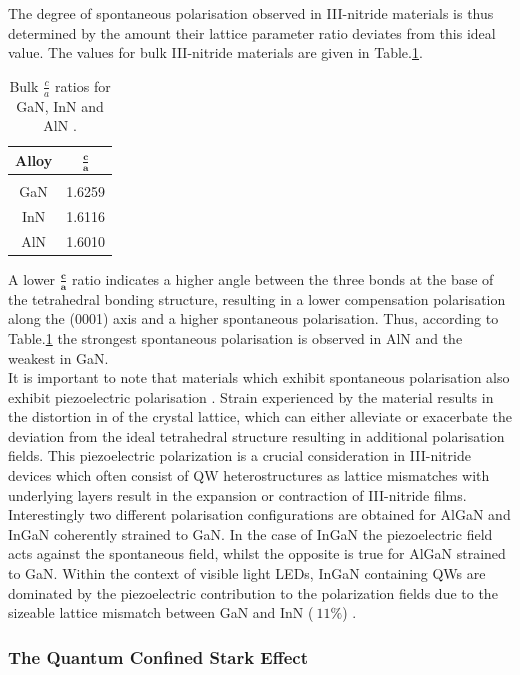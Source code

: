 The degree of spontaneous polarisation observed in III-nitride materials is thus determined by the amount their lattice parameter ratio deviates from this ideal value. The values for bulk III-nitride materials are given in Table.\ref{tab1.3}. 

\begin{table}[!htb]
	\centering
	\label{tab1.1}
	\begin{tabular}{cc}
		\textbf{Alloy} &  $\mathbf{\frac{c}{a}}$ \\
		\hline\hline\\
		GaN   & 1.6259      \\
		InN   & 1.6116     \\
		AlN   & 1.6010   \\ 
		\hline
	\end{tabular}
	\caption{Bulk $\frac{c}{a}$ ratios for GaN, InN and AlN \cite{Ren2015}.}
	\label{tab1.3}
\end{table}

A lower $\mathbf{\frac{c}{a}}$ ratio indicates a higher angle between the three bonds at the base of the tetrahedral bonding structure, resulting in a lower compensation polarisation along the (0001) axis and a higher spontaneous polarisation. Thus, according to Table.\ref{tab1.3} the strongest spontaneous polarisation is observed in AlN and the weakest in GaN.\\
It is important to note that materials which exhibit spontaneous polarisation also exhibit piezoelectric polarisation \cite{Ambacher2002}. Strain experienced by the material results in the distortion in of the crystal lattice, which can either alleviate or exacerbate the deviation from the ideal tetrahedral structure resulting in additional polarisation fields. This piezoelectric polarization is a crucial consideration in III-nitride devices which often consist of QW heterostructures as lattice mismatches with underlying layers result in the expansion or contraction of III-nitride films. Interestingly two different polarisation configurations are obtained for AlGaN and InGaN coherently strained to GaN. In the case of InGaN the piezoelectric field acts against the spontaneous field, whilst the opposite is true for AlGaN strained to GaN. Within the context of visible light LEDs, InGaN containing QWs are dominated by the piezoelectric contribution to the polarization fields \cite{Fiorentini1999} due to the sizeable lattice mismatch between GaN and InN ($~11\%$) \cite{Chichibu2006}.

\subsubsection{The Quantum Confined Stark Effect}

